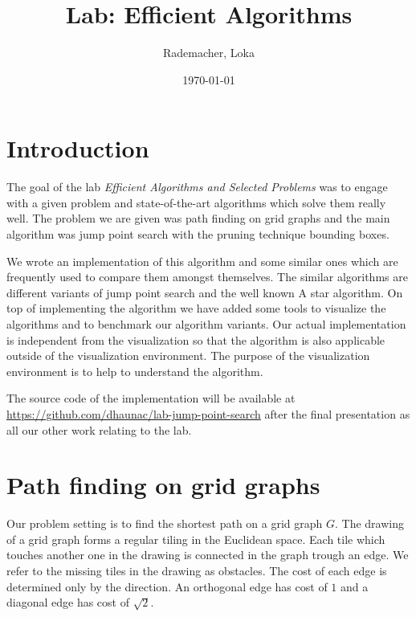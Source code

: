 \documentclass{article}
\begin{document}
    \title{Lab: Efficient Algorithms}
    \author{Rademacher, Loka}
    \date{\today}

    \thispagestyle{empty}
    \begin{center}
        \noindent
        \makebox[0pt][r]{\thedate}


        \noindent
        \centerline{\huge \sc \thetitle}

        \vspace*{-2pt}

        \noindent
        \centerline{\large {\theauthor}}
    \end{center}



    \section{Introduction}

    The goal of the lab \textit{Efficient Algorithms and Selected Problems} was to engage with a given problem and state-of-the-art algorithms which solve them really well. The problem we are given was path finding on grid graphs and the main algorithm was jump point search with the pruning technique bounding boxes.

    We wrote an implementation of this algorithm and some similar ones which are frequently used to compare them amongst themselves. The similar algorithms are different variants of jump point search and the well known A star algorithm. On top of implementing the algorithm we have added some tools to visualize the algorithms and to benchmark our algorithm variants. Our actual implementation is independent from the visualization so that the algorithm is also applicable outside of the visualization environment. The purpose of the visualization environment is to help to understand the algorithm.

    The source code of the implementation will be available at \url{https://github.com/dhaunac/lab-jump-point-search} after the final presentation as all our other work relating to the lab.



    \section{Path finding on grid graphs}

    Our problem setting is to find the shortest path on a grid graph $G$. The drawing of a grid graph forms a regular tiling in the Euclidean space. Each tile which touches another one in the drawing is connected in the graph trough an edge. We refer to the missing tiles in the drawing as obstacles. The cost of each edge is determined only by the direction. An orthogonal edge has cost of $1$ and a diagonal edge has cost of $\sqrt{2}$.
\end{document}
